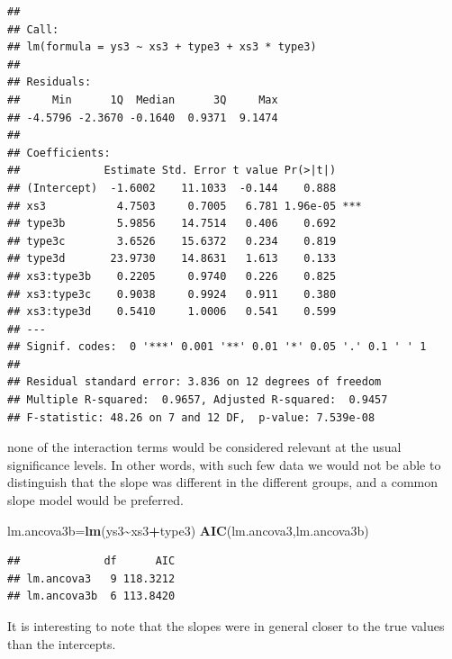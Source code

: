 \documentclass[
]{book}
\newenvironment{Shaded}{\begin{snugshade}}{\end{snugshade}}
\newcommand{\FunctionTok}[1]{\textcolor[rgb]{0.13,0.29,0.53}{\textbf{#1}}}
\newcommand{\NormalTok}[1]{#1}
\newcommand{\OtherTok}[1]{\textcolor[rgb]{0.56,0.35,0.01}{#1}}
\newcommand{\SpecialCharTok}[1]{\textcolor[rgb]{0.81,0.36,0.00}{\textbf{#1}}}
\begin{document}
\begin{verbatim}
## 
## Call:
## lm(formula = ys3 ~ xs3 + type3 + xs3 * type3)
## 
## Residuals:
##     Min      1Q  Median      3Q     Max 
## -4.5796 -2.3670 -0.1640  0.9371  9.1474 
## 
## Coefficients:
##             Estimate Std. Error t value Pr(>|t|)    
## (Intercept)  -1.6002    11.1033  -0.144    0.888    
## xs3           4.7503     0.7005   6.781 1.96e-05 ***
## type3b        5.9856    14.7514   0.406    0.692    
## type3c        3.6526    15.6372   0.234    0.819    
## type3d       23.9730    14.8631   1.613    0.133    
## xs3:type3b    0.2205     0.9740   0.226    0.825    
## xs3:type3c    0.9038     0.9924   0.911    0.380    
## xs3:type3d    0.5410     1.0006   0.541    0.599    
## ---
## Signif. codes:  0 '***' 0.001 '**' 0.01 '*' 0.05 '.' 0.1 ' ' 1
## 
## Residual standard error: 3.836 on 12 degrees of freedom
## Multiple R-squared:  0.9657, Adjusted R-squared:  0.9457 
## F-statistic: 48.26 on 7 and 12 DF,  p-value: 7.539e-08
\end{verbatim}

none of the interaction terms would be considered relevant at the usual significance levels. In other words, with such few data we would not be able to distinguish that the slope was different in the different groups, and a common slope model would be preferred.

\begin{Shaded}
\begin{Highlighting}[]
\NormalTok{lm.ancova3b}\OtherTok{=}\FunctionTok{lm}\NormalTok{(ys3}\SpecialCharTok{\textasciitilde{}}\NormalTok{xs3}\SpecialCharTok{+}\NormalTok{type3)}
\FunctionTok{AIC}\NormalTok{(lm.ancova3,lm.ancova3b)}
\end{Highlighting}
\end{Shaded}

\begin{verbatim}
##             df      AIC
## lm.ancova3   9 118.3212
## lm.ancova3b  6 113.8420
\end{verbatim}

It is interesting to note that the slopes were in general closer to the true values than the intercepts.
\end{document}
